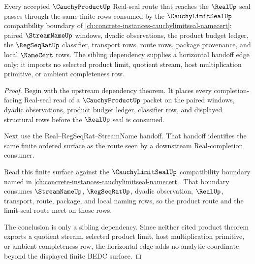 \begin{theorem}
\label{thm:cauchy-product-limitseal-sibling-dependency}
Every accepted $\CauchyProductUp$ Real-seal route that reaches the $\RealUp$ seal passes through the same finite rows consumed by the $\CauchyLimitSealUp$ compatibility boundary of \autoref{ch:concrete-instances-cauchylimitseal-namecert}: paired $\StreamNameUp$ windows, dyadic observations, the product budget ledger, the $\RegSeqRatUp$ classifier, transport rows, route rows, package provenance, and local $\NameCert$ rows. The sibling dependency supplies a horizontal handoff edge only; it imports no selected product limit, quotient stream, host multiplication primitive, or ambient completeness row.
\end{theorem}
\begin{proof}
Begin with the upstream dependency theorem. It places every completion-facing Real-seal read of a $\CauchyProductUp$ packet on the paired windows, dyadic observations, product budget ledger, classifier row, and displayed structural rows before the $\RealUp$ seal is consumed.

Next use the Real--RegSeqRat--StreamName handoff. That handoff identifies the same finite ordered surface as the route seen by a downstream Real-completion consumer.

Read this finite surface against the $\CauchyLimitSealUp$ compatibility boundary named in \autoref{ch:concrete-instances-cauchylimitseal-namecert}. That boundary consumes $\StreamNameUp$, $\RegSeqRatUp$, dyadic observation, $\RealUp$, transport, route, package, and local naming rows, so the product route and the limit-seal route meet on those rows.

The conclusion is only a sibling dependency. Since neither cited product theorem exports a quotient stream, selected product limit, host multiplication primitive, or ambient completeness row, the horizontal edge adds no analytic coordinate beyond the displayed finite BEDC surface.
\end{proof}

